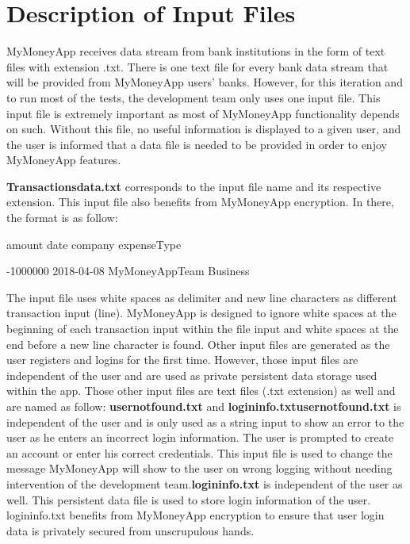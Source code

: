 \documentclass{article}
\begin{document}
\section{Description of Input Files}

MyMoneyApp receives data stream from bank institutions in the form of text files with extension .txt. There is one text file for every bank data stream that will be provided from MyMoneyApp users' banks. However, for this iteration and to run most of the tests, the development team only uses one input file. \newline 
This input file is extremely important as most of MyMoneyApp functionality depends on such. Without this file, no useful information is displayed to a given user, and the user is informed that a data file is needed to be provided in order to enjoy MyMoneyApp features. \newline\newline

\textbf{Transactions\textunderscore data.txt} corresponds to the input file name and its respective extension. This input file also benefits from MyMoneyApp encryption. In there, the format is as
follow: \newline \centerline{amount date company expenseType}
\newline\centerline{-1000000 2018-04-08 MyMoneyAppTeam Business}
\newline\newline The input file uses white spaces as delimiter and new line characters as different transaction input (line). MyMoneyApp is designed to ignore white spaces at the beginning of each transaction input within the file input and white spaces at the end before a new line character is found. 
\newline \newline
Other input files are generated as the user registers and logins for the first time. However, those input files are independent of the user and are used as private persistent data storage used within the app. Those other input files are text files (.txt extension) as well and are named as follow: \textbf{user\textunderscore not\textunderscore found.txt} and \textbf{login\textunderscore info.txt}\newline\newline\newline\textbf{user\textunderscore not\textunderscore found.txt} is independent of the user and is only used as a string input to show an error to the user as he enters an incorrect login information. The user is prompted to create an account or enter his correct credentials. This input file is used to change the message MyMoneyApp will show to the user on wrong logging without needing intervention of the development team.\newline\newline\newline\textbf{login\textunderscore info.txt} is independent of the user as well. This persistent data file is used to store login information of the user. login\textunderscore info.txt benefits from MyMoneyApp encryption to ensure that user login data is privately secured from unscrupulous hands.
\end{document}
